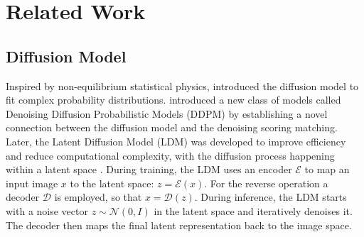 \section{Related Work}
\subsection{Diffusion Model}

Inspired by non-equilibrium statistical physics, \cite{sohldickstein2015deepunsupervisedlearningusing} introduced the diffusion model to fit complex probability distributions. \cite{ho2020denoisingdiffusionprobabilisticmodels} introduced a new class of models called Denoising Diffusion Probabilistic Models (DDPM) by establishing a novel connection between the diffusion model and the denoising scoring matching. Later, the Latent Diffusion Model (LDM)  was developed to improve efficiency and reduce computational complexity, with the diffusion process happening within a latent space   \cite{rombach2022high}. During training, the LDM uses an encoder $\mathcal{E}$ to map an input image $x$ to the latent space: $z = \mathcal{E}(x)$. For the reverse operation a decoder $\mathcal{D}$ is employed, so that $x = \mathcal{D}(z)$. During inference, the LDM starts with a noise vector $z \sim \mathcal{N}(0, I)$ in the latent space and iteratively denoises it. The decoder then maps the final latent representation back to the image space.

